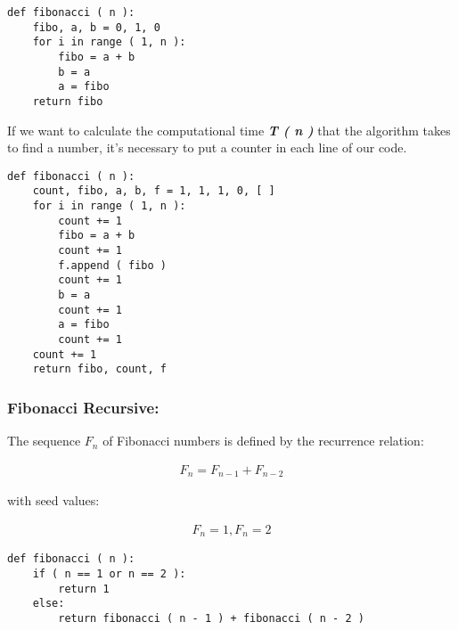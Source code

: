 \documentclass[10pt,a4paper]{article}
\begin{document}
\begin{lstlisting}
def fibonacci ( n ):
	fibo, a, b = 0, 1, 0
    for i in range ( 1, n ):
        fibo = a + b
        b = a
        a = fibo
    return fibo
\end{lstlisting} \hfill

If we want to calculate the computational time {\bfseries\itshape T ( n )} that the algorithm takes to find a number, it's necessary to put a counter in each line of our code. \hfill \break

\begin{lstlisting}
def fibonacci ( n ):
    count, fibo, a, b, f = 1, 1, 1, 0, [ ]
    for i in range ( 1, n ):
        count += 1
        fibo = a + b
        count += 1
        f.append ( fibo )
        count += 1
        b = a
        count += 1
        a = fibo
        count += 1
    count += 1
    return fibo, count, f
\end{lstlisting} \hfill

{\bfseries\itshape\color{OliveGreen}{Observation:}} {\itshape\color{OliveGreen}{Now, apart of return the Fibonacci number result, the code will also return the counter and a list of all the previous Fibonacci numbers after 'n'.}} \hfill \break

{\bfseries\itshape\color{OliveGreen}{Observation:}} {\itshape{}}

\pagebreak

\subsubsection{Fibonacci Recursive:}

The sequence $F_{n}$ of Fibonacci numbers is defined by the recurrence relation:

\begin{ceqn}
\begin{align}
F_{n} = F_{n-1} + F_{n-2}
\end{align}
\end{ceqn}

with seed values:

\begin{ceqn}
\begin{align}
F_{n} = 1, F_{n} = 2
\end{align}
\end{ceqn} 

\begin{lstlisting}
def fibonacci ( n ):
    if ( n == 1 or n == 2 ):
        return 1
    else:
        return fibonacci ( n - 1 ) + fibonacci ( n - 2 )
\end{lstlisting} \hfill
\end{document}
